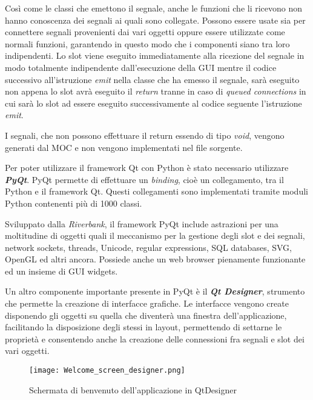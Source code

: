 Così come le classi che emettono il segnale, anche le funzioni che li ricevono non hanno conoscenza dei segnali ai quali sono collegate. Possono essere usate sia per connettere segnali provenienti dai vari oggetti oppure essere utilizzate come normali funzioni, garantendo in questo modo che i componenti siano tra loro indipendenti. Lo slot viene eseguito immediatamente alla ricezione del segnale in modo totalmente indipendente dall'esecuzione della GUI mentre il codice successivo all'istruzione \textit{emit} nella classe che ha emesso il segnale, sarà eseguito non appena lo slot avrà eseguito il \textit{return} tranne in caso di \textit{queued connections} in cui sarà lo slot ad essere eseguito successivamente al codice seguente l'istruzione \textit{emit}.

I segnali, che non possono effettuare il return essendo di tipo \textit{void}, vengono generati dal MOC e non vengono implementati nel file sorgente. 

Per poter utilizzare il framework Qt con Python è stato necessario utilizzare \textbf{\textit{PyQt}}. PyQt permette di effettuare un \textit{binding}, cioè un collegamento, tra il Python e il framework Qt. Questi collegamenti sono implementati tramite moduli Python contenenti più di 1000 classi.

Sviluppato dalla \textit{Riverbank}, il framework PyQt include astrazioni per una moltitudine di oggetti quali il meccanismo per la gestione degli slot e dei segnali, network sockets, threads, Unicode, regular expressions, SQL databases, SVG, OpenGL ed altri ancora. Possiede
anche un web browser pienamente funzionante ed un insieme di GUI widgets.

Un altro componente importante presente in PyQt è il \textbf{\textit{Qt Designer}}, strumento che permette la creazione di interfacce grafiche. 
Le interfacce vengono create disponendo gli oggetti su quella che diventerà una finestra dell'applicazione, facilitando la disposizione degli stessi in layout, permettendo di settarne le proprietà e consentendo anche la creazione delle connessioni fra segnali e slot dei vari oggetti.

\clearpage

\begin{figure}[htpb]
	\begin{center}
		\texttt{[image: Welcome\_screen\_designer.png]}
	\end{center}
	\caption[Schermata di benvenuto dell'applicazione in QtDesigner]{Schermata di benvenuto dell'applicazione in QtDesigner}
\end{figure}

